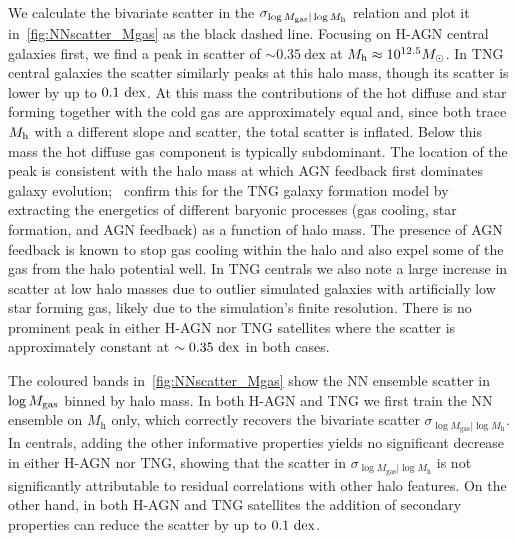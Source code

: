 \documentclass[usenatbib,useAMS]{mnras}
\begin{document}
We calculate the bivariate scatter in the $\sigma_{\log M_\mathrm{gas} | \log M_{\rm h}}$ relation and plot it in~\cref{fig:NNscatter_Mgas} as the black dashed line. Focusing on H-AGN central galaxies first, we find a peak in scatter of $\sim 0.35~\mathrm{dex}$ at $M_{\rm h}\approx 10^{12.5} M_\odot$. In TNG central galaxies the scatter similarly peaks at this halo mass, though its scatter is lower by up to $0.1~{\rm dex}$. At this mass the contributions of the hot diffuse and star forming together with the cold gas are approximately equal and, since both trace $M_{\rm h}$ with a different slope and scatter, the total scatter is inflated. Below this mass the hot diffuse gas component is typically subdominant. The location of the peak is consistent with the halo mass at which AGN feedback first dominates galaxy evolution;~\citet*[see Figure 7]{Anbajagane_2022} confirm this for the TNG galaxy formation model by extracting the energetics of different baryonic processes (gas cooling, star formation, and AGN feedback) as a function of halo mass. The presence of AGN feedback is known to stop gas cooling within the halo and also expel some of the gas from the halo potential well. In TNG centrals we also note a large increase in scatter at low halo masses due to outlier simulated galaxies with artificially low star forming gas, likely due to the simulation's finite resolution. There is no prominent peak in either H-AGN nor TNG satellites where the scatter is approximately constant at $\sim0.35~{\rm dex}$ in both cases.

The coloured bands in~\cref{fig:NNscatter_Mgas} show the NN ensemble scatter in $\log M_{\rm gas}$ binned by halo mass. In both H-AGN and TNG we first train the NN ensemble on $M_\mathrm{h}$ only, which correctly recovers the bivariate scatter $\sigma_{\log M_\mathrm{gas} | \log M_\mathrm{h}}$. In centrals, adding the other informative properties yields no significant decrease in either H-AGN nor TNG, showing that the scatter in $\sigma_{\log M_\mathrm{gas} | \log M_\mathrm{h}}$ is not significantly attributable to residual correlations with other halo features. On the other hand, in both H-AGN and TNG satellites the addition of secondary properties can reduce the scatter by up to $0.1~{\rm dex}$.
\end{document}

